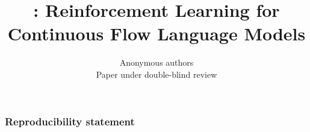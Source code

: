 \documentclass{article}
\title{\method{}: Reinforcement Learning for Continuous Flow Language Models}
\author{Anonymous authors\\ Paper under double-blind review}
\begin{document}
\maketitle










\subsubsection*{Reproducibility statement}





\appendix





\end{document}
